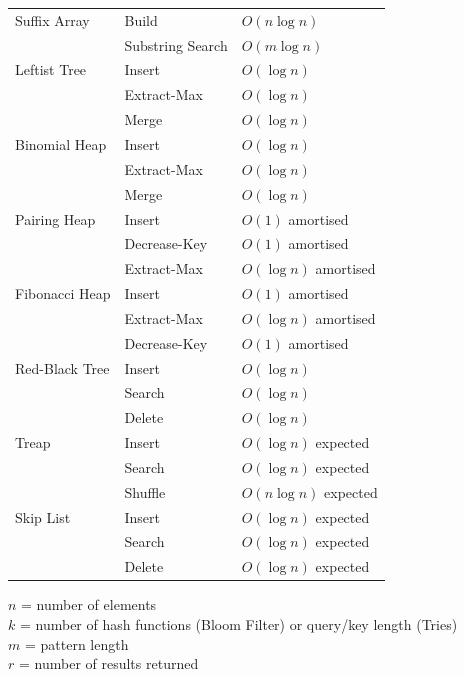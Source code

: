 \documentclass[12pt, a4paper]{article}
\begin{document}
\begin{tabular}{@{} p{4.5cm} p{4.5cm} p{4.5cm} @{}}
Suffix Array & Build & $O(n \log n)$ \\
             & Substring Search & $O(m \log n)$ \\[6pt]

Leftist Tree & Insert & $O(\log n)$ \\
             & Extract-Max & $O(\log n)$ \\
             & Merge & $O(\log n)$ \\[6pt]

Binomial Heap & Insert & $O(\log n)$ \\
              & Extract-Max & $O(\log n)$ \\
              & Merge & $O(\log n)$ \\[6pt]

Pairing Heap & Insert & $O(1)$ amortised \\
             & Decrease-Key & $O(1)$ amortised \\
             & Extract-Max & $O(\log n)$ amortised \\[6pt]

Fibonacci Heap & Insert & $O(1)$ amortised \\
               & Extract-Max & $O(\log n)$ amortised \\
               & Decrease-Key & $O(1)$ amortised \\[6pt]

Red-Black Tree & Insert & $O(\log n)$ \\
               & Search & $O(\log n)$ \\
               & Delete & $O(\log n)$ \\[6pt]

Treap & Insert & $O(\log n)$ expected \\
      & Search & $O(\log n)$ expected \\
      & Shuffle & $O(n \log n)$ expected \\[6pt]

Skip List & Insert & $O(\log n)$ expected \\
          & Search & $O(\log n)$ expected \\
          & Delete & $O(\log n)$ expected \\
\end{tabular}

\vspace{0.5cm}

$n$ = number of elements\\
$k$ = number of hash functions (Bloom Filter) or query/key length (Tries)\\
$m$ = pattern length\\
$r$ = number of results returned
\end{document}
